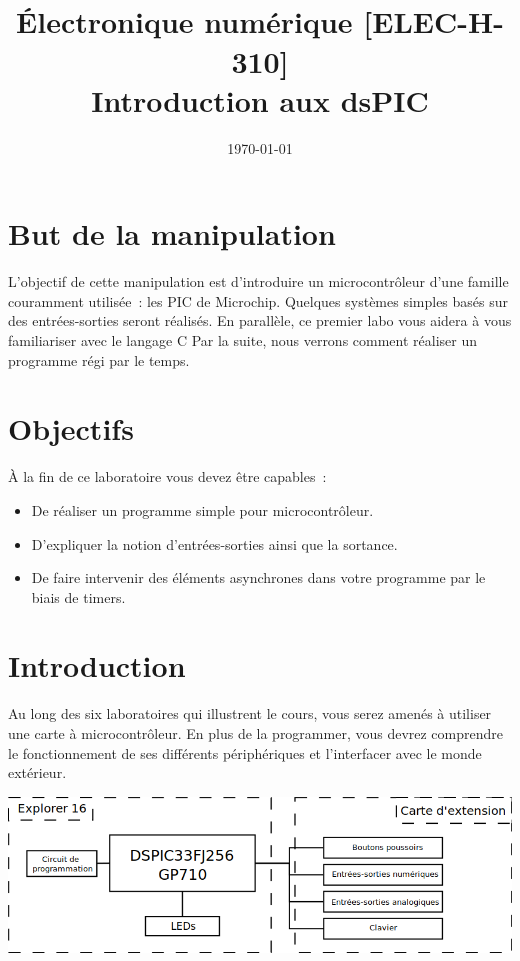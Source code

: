 \documentclass[11pt,a4paper]{article}
\date{\vspace{-1.7cm}\mydate\today}
\title{\vspace{-2cm} \labonumber\\ Électronique numérique [ELEC-H-310]\\Introduction aux dsPIC\ifthenelse{\boolean{corrige}}{~\\Corrigé}{}}
\theoremstyle{definition}%
\begin{document}
\pagestyle{empty}
\maketitle
\section*{But de la manipulation}
L’objectif de cette manipulation est d’introduire un microcontrôleur d’une famille couramment utilisée~: les PIC de Microchip.
Quelques systèmes simples basés sur des entrées-sorties seront réalisés.
En parallèle, ce premier labo vous aidera à vous familiariser avec le langage C
Par la suite, nous verrons comment réaliser un programme régi par le temps.


\section*{Objectifs}
À la fin de ce laboratoire vous devez être capables~:
\begin{itemize}
\item De réaliser un programme simple pour microcontrôleur.
\item D’expliquer la notion d’entrées-sorties ainsi que la sortance.
\item De faire intervenir des éléments asynchrones dans votre programme par le biais de
timers.
\end{itemize}
\newpage{}


\section{Introduction}
Au long des six laboratoires qui illustrent le cours, vous serez amenés à utiliser une carte à microcontrôleur.
En plus de la programmer, vous devrez comprendre le fonctionnement de ses différents périphériques et l’interfacer avec le monde extérieur.

\includegraphics[width=\textwidth]{pic33}
\end{document}
